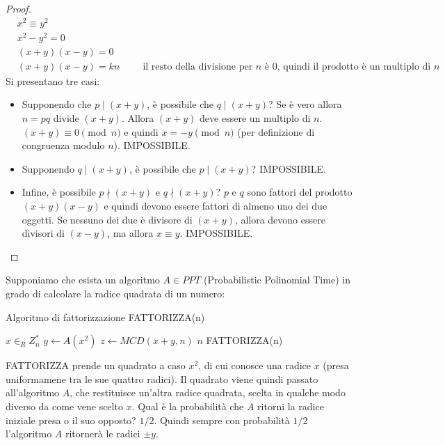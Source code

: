 \begin{proof}
\begin{align*}
    &x^2 \equiv y^2\\
    &x^2 - y^2 = 0\\
    &(x+y)(x-y) = 0\\
    &(x+y)(x-y) = kn \hspace{1cm} \text{il resto della divisione per $n$ è 0, quindi il prodotto è un multiplo di $n$}
\end{align*}
\noindent Si presentano tre casi:
\begin{itemize}
    \item Supponendo che $p \mid(x+y)$, è possibile che $q \mid(x+y)$? Se è vero allora $n = pq$ divide $(x+y)$. Allora $(x+y)$ deve essere un multiplo di $n$. $(x+y) \equiv 0 \pmod n$ e quindi $x = -y \pmod n$ (per definizione di congruenza modulo $n$). IMPOSSIBILE.

   \item Supponendo $q \mid(x+y)$, è possibile che $p \mid(x+y)$? IMPOSSIBILE.

   \item  Infine, è possibile $p \nmid(x+y)$ e $q \nmid(x+y)$? $p$ e $q$ sono fattori del prodotto $(x+y)(x-y)$ e quindi devono essere fattori di almeno uno dei due oggetti. Se nessuno dei due è divisore di $(x+y)$, allora devono essere divisori di $(x-y)$, ma allora $x \equiv y$. IMPOSSIBILE.
\end{itemize}
\end{proof}

\noindent Supponiamo che esista un algoritmo $A \in PPT$ (Probabilistic Polinomial Time) in grado di calcolare la radice quadrata di un numero:

\begin{algorithm}[H]
\caption{Algoritmo di fattorizzazione FATTORIZZA(n)}\label{alg:cap}
\begin{algorithmic}
\State $x \in_R Z_n^*$
\State $y \gets A(x^2)$
\State $z \gets MCD(x+y, n)$
    \State \Return $n$
\Else
    \State \Return FATTORIZZA(n)
\EndIf
\end{algorithmic}
\end{algorithm}

\noindent FATTORIZZA prende un quadrato a caso $x^2$, di cui conosce una radice $x$ (presa uniformamene tra le sue quattro radici). Il quadrato viene quindi passato all'algoritmo $A$, che restituisce un'altra radice quadrata, scelta in qualche modo diverso da come vene scelto $x$. Qual è la probabilità che $A$ ritorni la radice iniziale presa o il suo opposto? $1 / 2$. Quindi sempre con probabilità $1 / 2$ l'algoritmo $A$ ritornerà le radici $\pm y$. 

